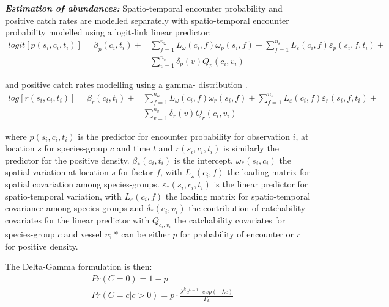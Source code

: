 \documentclass{nature}
\begin{document}
\begin{linenumbers}
\textbf{\textit{Estimation of abundances:}} Spatio-temporal encounter
probability and positive catch rates are modelled separately with
spatio-temporal encounter probability modelled using a logit-link linear
predictor;
		\begin{equation}
			\begin{split}
			logit[p(s_{i},c_{i},t_{i})] =	\beta_{p}(c_{i},t_{i}) +
			& \sum\limits_{f=1}^{n_{\omega}} L_{\omega}(c_{i},f)
			\omega_{p}(s_{i},f) + \sum\limits_{f=1}^{n_{\varepsilon}}
			L_{\varepsilon}(c_{i},f) \varepsilon_{p}(s_{i},f,t_{i}) + \\ 
			& \sum\limits_{v=1}^{n_{v}}\delta_{p}(v)Q_{p}(c_{i}, v_{i})
		\end{split}
		\end{equation}

and positive catch rates modelling using a gamma- distribution \cite{Thorson2015a}. 
		\begin{equation}
			\begin{split}
			log[r(s_{i},c_{i},t_{i})] = \beta_{r}(c_{i},t_{i}) +
			& \sum\limits_{f=1}^{n_{\omega}} L_{\omega}(c_{i},f)
			\omega_{r}(s_{i},f) +\sum\limits_{f=1}^{n_{\varepsilon}} 
			L_{\varepsilon}(c_{i},f) \varepsilon_{r}(s_{i},f,t_{i}) + \\
			& \sum\limits_{v=1}^{n_{v}}\delta_{r}(v) Q_{r}(c_{i}, v_{i})
			\end{split}
		\end{equation}

where $p(s_{i}, c_{i}, t_{i})$ is the predictor for encounter probability for
observation $i$, at location $s$ for species-group $c$ and time $t$ and
$r(s_{i}, c_{i}, t_{i})$ is similarly the predictor for the positive density.
$\beta_{*}(c_{i},t_{i})$ is the intercept, $\omega_{*}(s_{i},c_{i})$ the
spatial variation at location $s$ for factor $f$, with $L_{\omega}(c_{i},f)$
the loading matrix for spatial covariation among species-groups.
$\varepsilon_{*}(s_{i},c_{i},t_{i})$ is the linear predictor for
spatio-temporal variation, with $L_{\varepsilon}(c_{i}, f)$ the loading matrix
for spatio-temporal covariance among species-groups and $\delta_{*}(c_{i},
v_{i})$ the contribution of catchability covariates for the linear predictor
with $Q_{c_{i}, v_{i}}$ the catchability covariates for species-group $c$ and
vessel $v$;  $*$ can be either $p$ for probability of encounter or $r$ for
positive density.

The Delta-Gamma formulation is then:
\begin{equation}
	\begin{split}
	& Pr(C = 0) = 1 - p \\
	& Pr(C = c | c > 0) = p \cdot \frac{\lambda^{k}c^{k-1} \cdot exp(-\lambda c)}{\Gamma_{k}}
	\end{split}
\end{equation}


\end{linenumbers}
\end{document}
